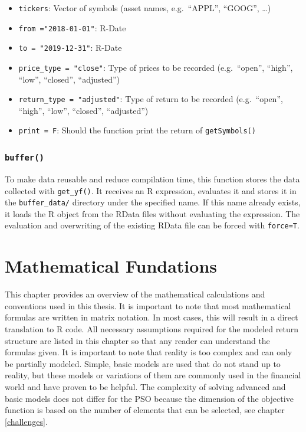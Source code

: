 \documentclass[
  oneside]{book}
\providecommand{\tightlist}{%
  \setlength{\itemsep}{0pt}\setlength{\parskip}{0pt}}
\begin{document}
\begin{itemize}
\tightlist
\item
  \texttt{tickers}: Vector of symbols (asset names, e.g.~``APPL'', ``GOOG'', \ldots)
\item
  \texttt{from\ ="2018-01-01"}: R-Date
\item
  \texttt{to\ =\ "2019-12-31"}: R-Date
\item
  \texttt{price\_type\ =\ "close"}: Type of prices to be recorded (e.g.~``open'', ``high'', ``low'', ``closed'', ``adjusted'')
\item
  \texttt{return\_type\ =\ "adjusted"}: Type of return to be recorded (e.g.~``open'', ``high'', ``low'', ``closed'', ``adjusted'')
\item
  \texttt{print\ =\ F}: Should the function print the return of \texttt{getSymbols()}
\end{itemize}

\hypertarget{buffer}{%
\subsection{\texorpdfstring{\texttt{buffer()}}{buffer()}}\label{buffer}}

To make data reusable and reduce compilation time, this function stores the data collected with \texttt{get\_yf()}. It receives an R expression, evaluates it and stores it in the \texttt{buffer\_data/} directory under the specified name. If this name already exists, it loads the R object from the RData files without evaluating the expression. The evaluation and overwriting of the existing RData file can be forced with \texttt{force=T}.

\hypertarget{mathfundations}{%
\chapter{Mathematical Fundations}\label{mathfundations}}

This chapter provides an overview of the mathematical calculations and conventions used in this thesis. It is important to note that most mathematical formulas are written in matrix notation. In most cases, this will result in a direct translation to R code. All necessary assumptions required for the modeled return structure are listed in this chapter so that any reader can understand the formulas given. It is important to note that reality is too complex and can only be partially modeled. Simple, basic models are used that do not stand up to reality, but these models or variations of them are commonly used in the financial world and have proven to be helpful. The complexity of solving advanced and basic models does not differ for the PSO because the dimension of the objective function is based on the number of elements that can be selected, see chapter \ref{challenges}.
\end{document}

